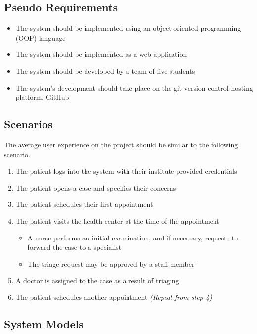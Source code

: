 \documentclass[a4paper, 12pt, titlepage]{article}
\begin{document}
  \subsection{Pseudo Requirements}

  \begin{itemize}
    \item The system should be implemented using an object-oriented programming (OOP) language
    \item The system should be implemented as a web application
    \item The system should be developed by a team of five students
    \item The system's development should take place on the git version control hosting platform, GitHub
  \end{itemize}

  \pagebreak
  \subsection{Scenarios}

  The average user experience on the project should be similar to the following scenario.

  \begin{enumerate}
    \item The patient logs into the system with their institute-provided credentials
    \item The patient opens a case and specifies their concerns
    \item The patient schedules their first appointment
    \item The patient visits the health center at the time of the appointment
    \begin{itemize}
      \item A nurse performs an initial examination, and if necessary, requests to forward the case to a specialist
      \item The triage request may be approved by a staff member
    \end{itemize}
    \item A doctor is assigned to the case as a result of triaging
    \item The patient schedules another appointment \textit{(Repeat from step 4)}
  \end{enumerate}

  \pagebreak
  \subsection{System Models}
\end{document}
